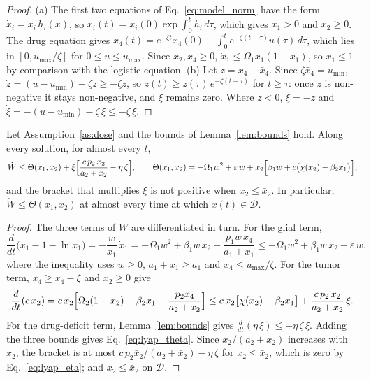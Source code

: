 \begin{proof}
(a) The first two equations of Eq.~\eqref{eq:model_norm} have the form $\dot x_i=x_i\,h_i(x)$, so $x_i(t)=x_i(0)\exp\int_0^th_i\,d\tau$, which gives $x_1>0$ and $x_2\ge0$. The drug equation gives $x_4(t)=e^{-\zeta t}x_4(0)+\int_0^te^{-\zeta(t-\tau)}u(\tau)\,d\tau$, which lies in $[0,u_{\max}/\zeta]$ for $0\le u\le u_{\max}$. Since $x_2,x_4\ge0$, $\dot x_1\le\Omega_1x_1(1-x_1)$, so $x_1\le1$ by comparison with the logistic equation. (b) Let $z=x_4-\bar x_4$. Since $\zeta\bar x_4=u_{\min}$, $\dot z=(u-u_{\min})-\zeta z\ge-\zeta z$, so $z(t)\ge z(\tau)\,e^{-\zeta(t-\tau)}$ for $t\ge\tau$: once $z$ is non-negative it stays non-negative, and $\xi$ remains zero. Where $z<0$, $\xi=-z$ and $\dot\xi=-(u-u_{\min})-\zeta\,\xi\le-\zeta\,\xi$.
\end{proof}

\begin{lemma}
\label{lem:wdot}
Let Assumption~\ref{as:dose} and the bounds of Lemma~\ref{lem:bounds} hold. Along every solution, for almost every $t$,
\begin{equation}
\dot W\le\Theta(x_1,x_2)+\xi\Bigl[\frac{c\,p_2\,x_2}{a_2+x_2}-\eta\,\zeta\Bigr],\qquad
\Theta(x_1,x_2)=-\Omega_1w^2+\varepsilon\,w+x_2\Bigl[\beta_1w+c\bigl(\chi(x_2)-\beta_2x_1\bigr)\Bigr],
\label{eq:lyap_theta}
\end{equation}
and the bracket that multiplies $\xi$ is not positive when $x_2\le\bar x_2$. In particular, $\dot W\le\Theta(x_1,x_2)$ at almost every time at which $x(t)\in\mathcal D$.
\end{lemma}

\begin{proof}
The three terms of $W$ are differentiated in turn. For the glial term,
\begin{equation}
\frac{d}{dt}\bigl(x_1-1-\ln x_1\bigr)=-\frac{w}{x_1}\,\dot x_1
=-\Omega_1w^2+\beta_1w\,x_2+\frac{p_1w\,x_4}{a_1+x_1}
\le-\Omega_1w^2+\beta_1w\,x_2+\varepsilon\,w ,
\label{eq:lyap_t1}
\end{equation}
where the inequality uses $w\ge0$, $a_1+x_1\ge a_1$ and $x_4\le u_{\max}/\zeta$. For the tumor term, $x_4\ge\bar x_4-\xi$ and $x_2\ge0$ give
\begin{equation}
\frac{d}{dt}(c\,x_2)=c\,x_2\Bigl[\Omega_2(1-x_2)-\beta_2x_1-\frac{p_2x_4}{a_2+x_2}\Bigr]
\le c\,x_2\bigl[\chi(x_2)-\beta_2x_1\bigr]+\frac{c\,p_2\,x_2}{a_2+x_2}\,\xi .
\label{eq:lyap_t2}
\end{equation}
For the drug-deficit term, Lemma~\ref{lem:bounds} gives $\tfrac{d}{dt}(\eta\,\xi)\le-\eta\,\zeta\,\xi$. Adding the three bounds gives Eq.~\eqref{eq:lyap_theta}. Since $x_2/(a_2+x_2)$ increases with $x_2$, the bracket is at most $c\,p_2\bar x_2/(a_2+\bar x_2)-\eta\,\zeta$ for $x_2\le\bar x_2$, which is zero by Eq.~\eqref{eq:lyap_eta}; and $x_2\le\bar x_2$ on $\mathcal D$.
\end{proof}

